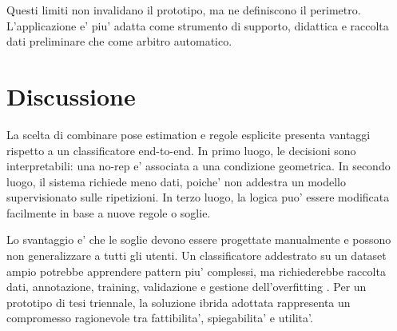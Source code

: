 Questi limiti non invalidano il prototipo, ma ne definiscono il perimetro. L'applicazione e' piu' adatta come strumento di supporto, didattica e raccolta dati preliminare che come arbitro automatico.

\section{Discussione}

La scelta di combinare pose estimation e regole esplicite presenta vantaggi rispetto a un classificatore end-to-end. In primo luogo, le decisioni sono interpretabili: una no-rep e' associata a una condizione geometrica. In secondo luogo, il sistema richiede meno dati, poiche' non addestra un modello supervisionato sulle ripetizioni. In terzo luogo, la logica puo' essere modificata facilmente in base a nuove regole o soglie.

Lo svantaggio e' che le soglie devono essere progettate manualmente e possono non generalizzare a tutti gli utenti. Un classificatore addestrato su un dataset ampio potrebbe apprendere pattern piu' complessi, ma richiederebbe raccolta dati, annotazione, training, validazione e gestione dell'overfitting \cite{geron2019hands,goodfellow2016deep}. Per un prototipo di tesi triennale, la soluzione ibrida adottata rappresenta un compromesso ragionevole tra fattibilita', spiegabilita' e utilita'.
